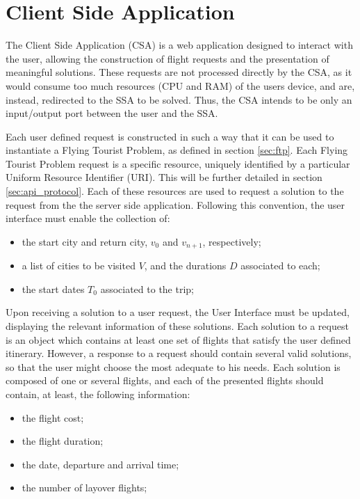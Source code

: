 \section{Client Side Application}
\label{sec:csa_design}

The Client Side Application (CSA) is a web application designed to interact with the user, allowing the construction of flight requests and the presentation of meaningful solutions. These requests are not processed directly by the CSA, as it would consume too much resources (CPU and RAM) of the users device, and are, instead, redirected to the SSA to be solved. Thus, the CSA intends to be only an input/output port between the user and the SSA. 

Each user defined request is constructed in such a way that it can be used to instantiate a Flying Tourist Problem, as defined in section \ref{sec:ftp}. Each Flying Tourist Problem request is a specific resource, uniquely identified by a particular Uniform Resource Identifier (URI). This will be further detailed in section \ref{sec:api_protocol}. Each of these resources are used to request a solution to the request from the the server side application. Following this convention, the user interface must enable the collection of:

\begin{itemize}
  \item the start city and return city, $v_{0}$ and $v_{n+1}$, respectively;
  \item a list of cities to be visited $V$, and the durations $D$ associated to each;
  \item the start dates $T_{0}$ associated to the trip;
\end{itemize}

Upon receiving a solution to a user request, the User Interface must be updated, displaying the relevant information of these solutions. Each solution to a request is an object which contains at least one set of flights that satisfy the user defined itinerary. However, a response to a request should 
contain several valid solutions, so that the user might choose the most adequate to his needs.
Each solution is composed of one or several flights, and each of the presented flights should contain, at least, the following information:

\begin{itemize}
  \item the flight cost;
  \item the flight duration;
  \item the date, departure and arrival time;
  \item the number of layover flights;
\end{itemize}

